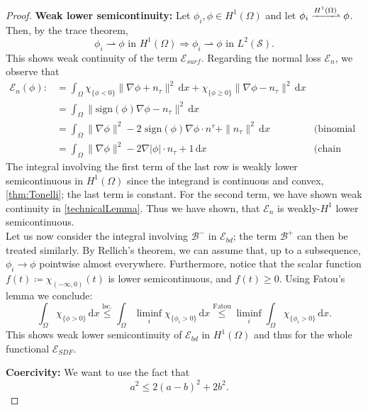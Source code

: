 \documentclass[12pt,openany]{book}
\def\S{\mathcal{S}}
\theoremstyle{plainnormal}
\theoremstyle{remark}
\begin{document}
\begin{proof}\textbf{Weak lower semicontinuity:}
Let $\phi_i, \phi \in H^1(\Omega)$ and let $\phi_i \xrightharpoonup{H^1(\Omega)}\phi$. Then, by the trace theorem, $$\phi_i \rightharpoonup\phi \text{ in }H^1(\Omega) \Rightarrow \phi_i \rightharpoonup\phi \text{ in }L^2(\S).$$
This shows weak continuity of the term $\mathcal{E}_{surf}$. Regarding the normal loss $\mathcal{E}_n$, we observe that \begin{align*}
    \mathcal{E}_n(\phi) :&= \int_\Omega \chi_{\{\phi < 0\}} \|\nabla \phi + n_\tau\|^2 \,\mathrm{d}x + \chi_{\{\phi \geq 0\}} \|\nabla \phi - n_\tau\|^2 \,\mathrm{d}x\\&= \int_\Omega \|\text{sign}(\phi) \nabla \phi - n_\tau\|^ 2\,\mathrm{d}x\\
    & =\int_\Omega \|\nabla \phi\|^2  -2 \text{ sign} (\phi) \nabla \phi \cdot n^\tau  + \|n_\tau\|^2 \,\mathrm{d}x \quad &\text{(binomial theorem)}\\
    &= \int_\Omega \|\nabla \phi\|^2  -2 \nabla |\phi| \cdot n_\tau  + 1 \,\mathrm{d}x &\text{(chain rule)}
\end{align*}
The integral involving the first term of the last row is weakly lower semicontinuous in $H^1(\Omega)$ since the integrand is continuous and convex, \cref{thm:Tonelli}; the last term is constant. For the second term, we have shown weak continuity in \cref{technicalLemma}. Thus we have shown, that $\mathcal{E}_n$ is weakly-$H^1$ lower semicontinuous.\\
Let us now consider the integral involving $\mathcal{B}^-$ in $\mathcal E_{bd}$; the term $\mathcal B^+$ can then be treated similarly. By Rellich's theorem, we can assume that, up to a subsequence, $\phi_i \rightarrow\phi$ pointwise almost everywhere. Furthermore, notice that the scalar function $f(t) \coloneqq \chi_{(-\infty, 0)}(t)$ is lower semicontinuous, and $f(t) \geq 0$. Using Fatou's lemma we conclude: $$\int_\Omega  \chi_{\{\phi > 0\}}  \,\mathrm{d}x \overset{\text{lsc.}}{\leq} \int_\Omega \liminf_i  \chi_{\{\phi_i > 0\}}  \,\mathrm{d}x \overset{\text{Fatou}}{\leq} \liminf_i\int_\Omega  \chi_{\{\phi_i > 0\}}  \,\mathrm{d}x.$$ This shows weak lower semicontinuity of $\mathcal{E}_{bd}$ in $H^1(\Omega)$ and thus for the whole functional $\mathcal{E}_{SDF}.$\par
\textbf{Coercivity:} We want to use the fact that 
\begin{equation}\label{eq:star_ineq_coerc}
    a^2 \leq 2(a-b)^2 + 2b^2. \quad \tag{$\star$}
\end{equation}

\end{proof}
\end{document}
